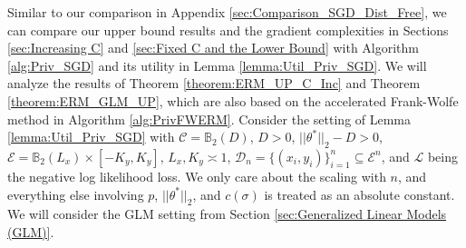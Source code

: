 \documentclass{article}
\begin{document}
Similar to our comparison in Appendix \ref{sec:Comparison_SGD_Dist_Free}, we can compare our upper bound results and the gradient complexities in Sections \ref{sec:Increasing C} and \ref{sec:Fixed C and the Lower Bound} with Algorithm \ref{alg:Priv_SGD} and its utility in Lemma \ref{lemma:Util_Priv_SGD}. We will analyze the results of Theorem \ref{theorem:ERM_UP_C_Inc} and Theorem \ref{theorem:ERM_GLM_UP}, which are also based on the accelerated Frank-Wolfe method in Algorithm \ref{alg:PrivFWERM}. Consider the setting of Lemma \ref{lemma:Util_Priv_SGD} with $\mathcal{C} = \mathbb{B}_2(D)$, $D > 0$, $||\theta^*||_2 - D > 0$, $\mathcal{E} = \mathbb{B}_2(L_x) \times [-K_y, K_y]$, $L_x, K_y \asymp 1$, $\mathcal{D}_n = \{(x_i, y_i)\}_{i = 1}^n \subseteq \mathcal{E}^n$, and $\mathcal{L}$ being the negative log likelihood loss. We only care about the scaling with $n$, and everything else involving $p$, $||\theta^*||_2$, and $c(\sigma)$ is treated as an absolute constant. We will consider the GLM setting from Section \ref{sec:Generalized Linear Models (GLM)}.
\end{document}
